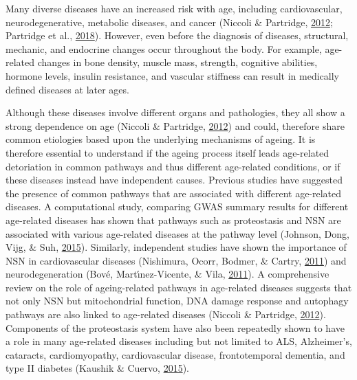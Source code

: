 \documentclass[12pt,twoside]{unicam}
\begin{document}
Many diverse diseases have an increased risk with age, including cardiovascular, neurodegenerative, metabolic diseases, and cancer (Niccoli \& Partridge, \protect\hyperlink{ref-Niccoli2012}{2012}; Partridge et al., \protect\hyperlink{ref-Partridge2018}{2018}). However, even before the diagnosis of diseases, structural, mechanic, and endocrine changes occur throughout the body. For example, age-related changes in bone density, muscle mass, strength, cognitive abilities, hormone levels, insulin resistance, and vascular stiffness can result in medically defined diseases at later ages.

Although these diseases involve different organs and pathologies, they all show a strong dependence on age (Niccoli \& Partridge, \protect\hyperlink{ref-Niccoli2012}{2012}) and could, therefore share common etiologies based upon the underlying mechanisms of ageing. It is therefore essential to understand if the ageing process itself leads age-related detoriation in common pathways and thus different age-related conditions, or if these diseases instead have independent causes. Previous studies have suggested the presence of common pathways that are associated with different age-related diseases. A computational study, comparing GWAS summary results for different age-related diseases has shown that pathways such as proteostasis and NSN are associated with various age-related diseases at the pathway level (Johnson, Dong, Vijg, \& Suh, \protect\hyperlink{ref-Johnson2015}{2015}). Similarly, independent studies have shown the importance of NSN in cardiovascular diseases (Nishimura, Ocorr, Bodmer, \& Cartry, \protect\hyperlink{ref-Nishimura2011}{2011}) and neurodegeneration (Bové, Martı́nez-Vicente, \& Vila, \protect\hyperlink{ref-Bove2011}{2011}). A comprehensive review on the role of ageing-related pathways in age-related diseases suggests that not only NSN but mitochondrial function, DNA damage response and autophagy pathways are also linked to age-related diseases (Niccoli \& Partridge, \protect\hyperlink{ref-Niccoli2012}{2012}). Components of the proteostasis system have also been repeatedly shown to have a role in many age-related diseases including but not limited to ALS, Alzheimer's, cataracts, cardiomyopathy, cardiovascular disease, frontotemporal dementia, and type II diabetes (Kaushik \& Cuervo, \protect\hyperlink{ref-Kaushik2015}{2015}).
\end{document}
